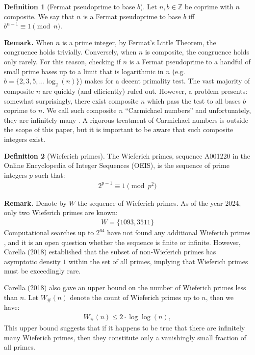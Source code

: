 \documentclass{article}
\theoremstyle{plain}
\theoremstyle{definition}
\newtheorem{definition}{Definition}
\begin{document}
\begin{definition}[Fermat pseudoprime to base $b$] \label{definition:fermatpsp}
Let $n,b \in \mathbb{Z}$ be coprime with $n$ composite. We say that $n$ is a Fermat pseudoprime to base $b$ iff $b^{n-1} \equiv 1 \pmod{n}$.

\textbf{Remark.}
When $n$ is a prime integer, by Fermat's Little Theorem, the congruence holds trivially. Conversely, when $n$ is composite, the congruence holds only rarely. For this reason, checking if $n$ is a Fermat pseudoprime to a handful of small prime bases up to a limit that is logarithmic in $n$ (e.g. $b = \{ 2, 3, 5, \ldots \log_2(n) \}$) makes for a decent primality test. The vast majority of composite $n$ are quickly (and efficiently) ruled out. However, a problem presents: somewhat surprisingly, there exist composite $n$ which pass the test to all bases $b$ coprime to $n$. We call such composite $n$ ``Carmichael numbers'' \cite{crandallpomerance2005carmichaelnumbers} and unfortunately, they are infinitely many \cite{alfordgranvillepomerance1994carmichaelnumbers}. A rigorous treatment of Carmichael numbers is outside the scope of this paper, but it is important to be aware that such composite integers exist.
\end{definition}

\begin{definition}[Wieferich primes] \label{definition:wieferichprimes}
The Wieferich primes, sequence A001220 \cite{oeiswieferichprimes} in the Online Encyclopedia of Integer Sequences (OEIS), is the sequence of prime integers $p$ such that:
\begin{align}
    2^{p-1} \equiv 1 \pmod{p^2}
\end{align}

\textbf{Remark.}
Denote by $W$ the sequence of Wieferich primes. As of the year 2024, only two Wieferich primes are known:
\begin{align}
    W = \{ 1093, 3511 \}
\end{align}
Computational searches up to $2^{64}$ have not found any additional Wieferich primes \cite{primegridww}, and it is an open question whether the sequence is finite or infinite. However, Carella (2018) \cite{carella2018results} established that the subset of non-Wieferich primes has asymptotic density $1$ within the set of all primes, implying that Wieferich primes must be exceedingly rare.

Carella (2018) \cite{carella2018results} also gave an upper bound on the number of Wieferich primes less than $n$. Let $W_{\#}(n)$ denote the count of Wieferich primes up to $n$, then we have:
\begin{align}
    W_{\#}(n) \leq 2 \cdot \log \log (n),
\end{align}
This upper bound suggests that if it happens to be true that there are infinitely many Wieferich primes, then they constitute only a vanishingly small fraction of all primes.
\end{definition}
\end{document}
